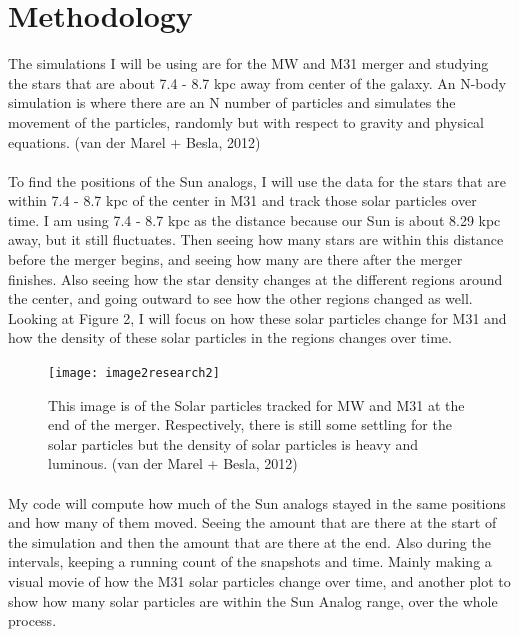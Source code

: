 \documentclass[fleqn,usenatbib]{mnras}
\begin{document}
\section{Methodology}

The simulations I will be using are for the MW and M31 merger and studying the stars that are about 7.4 - 8.7 kpc away from center of the galaxy. An N-body simulation is where there are an N number of particles and simulates the movement of the particles, randomly but with respect to gravity and physical equations. (van der Marel + Besla, 2012)

\paragraph{}
To find the positions of the Sun analogs, I will use the data for the stars that are within 7.4 - 8.7 kpc of the center in M31 and track those solar particles over time. I am using 7.4 - 8.7 kpc as the distance because our Sun is about 8.29 kpc away, but it still fluctuates. Then seeing how many stars are within this distance before the merger begins, and seeing how many are there after the merger finishes. Also seeing how the star density changes at the different regions around the center, and going outward to see how the other regions changed as well. 
Looking at Figure 2, I will focus on how these solar particles change for M31 and how the density of these solar particles in the regions changes over time.


\begin{figure}
\graphicspath{ {/home/} }
\texttt{[image: image2research2]}
\caption{This image is of the Solar particles tracked for MW and M31 at the end of the merger. Respectively, there is still some settling for the solar particles but the density of solar particles is heavy and luminous. (van der Marel + Besla, 2012)
}

\end{figure}

\paragraph{}

My code will compute how much of the Sun analogs stayed in the same positions and how many of them moved. Seeing the amount that are there at the start of the simulation and then the amount that are there at the end. Also during the intervals, keeping a running count of the snapshots and time. Mainly making a visual movie of how the M31 solar particles change over time, and another plot to show how many solar particles are within the Sun Analog range, over the whole process.
\end{document}

